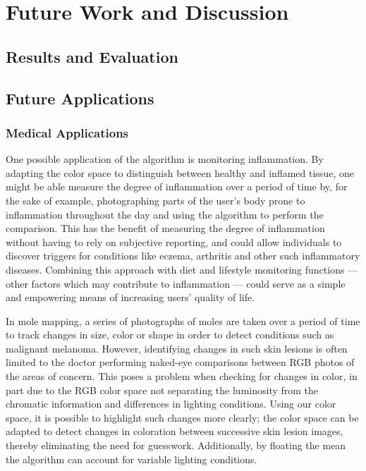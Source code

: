 
\chapter{Future Work and Discussion}

\ifpdf
    \graphicspath{{Chapter5/Figs/Raster/}{Chapter5/Figs/PDF/}{Chapter5/Figs/}}
\else
    \graphicspath{{Chapter5/Figs/Vector/}{Chapter5/Figs/}}
\fi
\section{Results and Evaluation}\label{sec:ResultsAndEvaluation}

\section{Future Applications}\label{sec:FutureApplications}


\subsection{Medical Applications}\label{sec:MedicalApplications}

One possible application of the algorithm is monitoring inflammation. By adapting the color space to distinguish between healthy and inflamed tissue, one might be able measure the degree of inflammation over a period of time by, for the sake of example, photographing parts of the user's body prone to inflammation throughout the day and using the algorithm to perform the comparison. This has the benefit of measuring the degree of inflammation without having to rely on subjective reporting, and could allow individuals to discover triggers for conditions like eczema, arthritis and other such inflammatory diseases. Combining this approach with diet and lifestyle monitoring functions --- other factors which may contribute to inflammation --- could serve as a simple and empowering means of increasing users' quality of life.

In mole mapping, a series of photographs of moles are taken over a period of time to track changes in size, color or shape in order to detect conditions such as malignant melanoma. However, identifying changes in such skin lesions is often limited to the doctor performing naked-eye comparisons between RGB photos of the areas of concern. This poses a problem when checking for changes in color, in part due to the RGB color space not separating the luminosity from the chromatic information and differences in lighting conditions. Using our color space, it is possible to highlight such changes more clearly; the color space can be adapted to detect changes in coloration between successive skin lesion images, thereby eliminating the need for guesswork. Additionally, by floating the mean the algorithm can account for variable lighting conditions.

